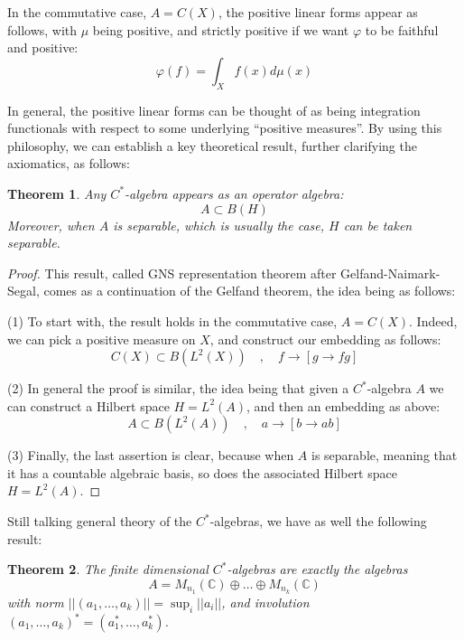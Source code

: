 \documentclass[12pt]{amsbook}
\newtheorem{theorem}{Theorem}[chapter]
\begin{document}
In the commutative case, $A=C(X)$, the positive linear forms appear as follows, with $\mu$ being positive, and strictly positive if we want $\varphi$ to be faithful and positive:
$$\varphi(f)=\int_Xf(x)d\mu(x)$$

In general, the positive linear forms can be thought of as being integration functionals with respect to some underlying ``positive measures''. By using this philosophy, we can establish a key theoretical result, further clarifying the axiomatics, as follows:


\begin{theorem}
Any $C^*$-algebra appears as an operator algebra:
$$A\subset B(H)$$
Moreover, when $A$ is separable, which is usually the case, $H$ can be taken separable.
\end{theorem}

\begin{proof}
This result, called GNS representation theorem after Gelfand-Naimark-Segal, comes as a continuation of the Gelfand theorem, the idea being as follows:

\medskip

(1) To start with, the result holds in the commutative case, $A=C(X)$. Indeed, we can pick a positive measure on $X$, and construct our embedding as follows:
$$C(X)\subset B(L^2(X))\quad,\quad f\to[g\to fg]$$

(2) In general the proof is similar, the idea being that given a $C^*$-algebra $A$ we can construct a Hilbert space $H=L^2(A)$, and then an embedding as above:
$$A\subset B(L^2(A))\quad,\quad a\to[b\to ab]$$

(3) Finally, the last assertion is clear, because when $A$ is separable, meaning that it has a countable algebraic basis, so does the associated Hilbert space $H=L^2(A)$.
\end{proof}

Still talking general theory of the $C^*$-algebras, we have as well the following result:


\begin{theorem}
The finite dimensional $C^*$-algebras are exactly the algebras
$$A=M_{n_1}(\mathbb C)\oplus\ldots\oplus M_{n_k}(\mathbb C)$$
with norm $||(a_1,\ldots,a_k)||=\sup_i||a_i||$, and involution $(a_1,\ldots,a_k)^*=(a_1^*,\ldots,a_k^*)$.
\end{theorem}
\end{document}
